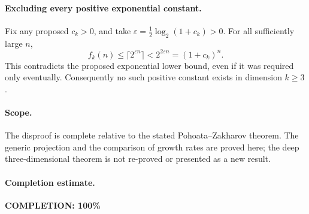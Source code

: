 \paragraph{Excluding every positive exponential constant.}
Fix any proposed \(c_k>0\), and take
\(\varepsilon=\tfrac12\log_2(1+c_k)>0\).
For all sufficiently large \(n\),
\[
 f_k(n)\leq\lceil2^{\varepsilon n}\rceil
          <2^{2\varepsilon n}=(1+c_k)^n.
\]
This contradicts the proposed exponential lower bound, even if it
was required only eventually. Consequently no such positive
constant exists in dimension \(k\geq3\).

\paragraph{Scope.}
The disproof is complete relative to the stated Pohoata--Zakharov
theorem. The generic projection and the comparison of growth rates
are proved here; the deep three-dimensional theorem is not
re-proved or presented as a new result.

\paragraph{Completion estimate.}
\textbf{COMPLETION: 100\%}
